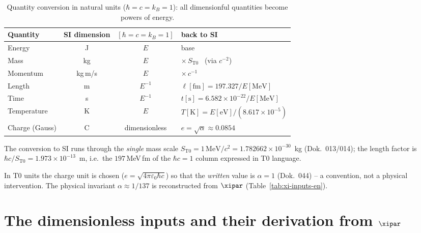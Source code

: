 \begin{table}[htbp]
  \centering
  \caption{Quantity conversion in natural units ($\hbar=c=k_B=1$): all
           dimensionful quantities become powers of energy.}
  \label{tab:nat-umrechnung-en}
  {\small
  \begin{tabular}{lccl}
    \toprule
    Quantity & SI dimension & $[\hbar=c=k_B=1]$ & back to SI \\
    \midrule
    Energy        & J        & $E$            & base \\
    Mass          & kg       & $E$            & $\times\,S_{\mathrm{T0}}$ \ (via $c^{-2}$) \\
    Momentum      & kg\,m/s  & $E$            & $\times\,c^{-1}$ \\
    Length        & m        & $E^{-1}$       & $\ell[\mathrm{fm}]=197{.}327/E[\mathrm{MeV}]$ \\
    Time          & s        & $E^{-1}$       & $t[\mathrm{s}]=6{.}582\times10^{-22}/E[\mathrm{MeV}]$ \\
    Temperature   & K        & $E$            & $T[\mathrm{K}]=E[\mathrm{eV}]/(8{.}617\times10^{-5})$ \\
    Charge (Gauss)& C        & dimensionless  & $e=\sqrt{\alpha}\approx0{.}0854$ \\
    \bottomrule
  \end{tabular}}

  \medskip
  \footnotesize
  The conversion to SI runs through the \emph{single} mass scale
  $S_{\mathrm{T0}} = 1\,\mathrm{MeV}/c^2 = 1{.}782662\times10^{-30}$~kg (Dok.~013/014);
  the length factor is $\hbar c/S_{\mathrm{T0}} = 1{.}973\times10^{-13}$~m, i.e.\ the
  $197$\,MeV\,fm of the $\hbar c=1$ column expressed in T0 language.\par\smallskip
  In T0 units the charge unit is chosen ($e=\sqrt{4\pi\varepsilon_0\hbar c}$) so that
  the \emph{written} value is $\alpha=1$ (Dok.~044) -- a convention, not a physical
  intervention. The physical invariant $\alpha\approx1/137$ is reconstructed from
  $\xipar$ (Table~\ref{tab:xi-inputs-en}).
\end{table}

\section{The dimensionless inputs and their derivation from $\xipar$}

